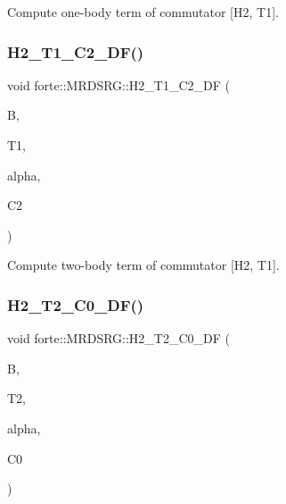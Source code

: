 Compute one-\/body term of commutator \mbox{[}H2, T1\mbox{]}. 

\mbox{\label{classforte_1_1_m_r_d_s_r_g_a7e71050dc24302f46d2efbb31038a0dd}} 
\subsubsection{\texorpdfstring{H2\+\_\+\+T1\+\_\+\+C2\+\_\+\+D\+F()}{H2\_T1\_C2\_DF()}}
{\footnotesize\ttfamily void forte\+::\+M\+R\+D\+S\+R\+G\+::\+H2\+\_\+\+T1\+\_\+\+C2\+\_\+\+DF (\begin{DoxyParamCaption}\item[{Blocked\+Tensor \&}]{B,  }\item[{Blocked\+Tensor \&}]{T1,  }\item[{const double \&}]{alpha,  }\item[{Blocked\+Tensor \&}]{C2 }\end{DoxyParamCaption})\hspace{0.3cm}{\ttfamily [protected]}}



Compute two-\/body term of commutator \mbox{[}H2, T1\mbox{]}. 

\mbox{\label{classforte_1_1_m_r_d_s_r_g_a1a0bb37a176d3ec04952088c2fe7f079}} 
\subsubsection{\texorpdfstring{H2\+\_\+\+T2\+\_\+\+C0\+\_\+\+D\+F()}{H2\_T2\_C0\_DF()}}
{\footnotesize\ttfamily void forte\+::\+M\+R\+D\+S\+R\+G\+::\+H2\+\_\+\+T2\+\_\+\+C0\+\_\+\+DF (\begin{DoxyParamCaption}\item[{Blocked\+Tensor \&}]{B,  }\item[{Blocked\+Tensor \&}]{T2,  }\item[{const double \&}]{alpha,  }\item[{double \&}]{C0 }\end{DoxyParamCaption})\hspace{0.3cm}{\ttfamily [protected]}}



